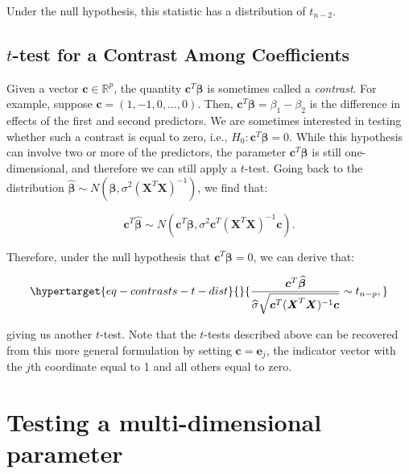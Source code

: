 \documentclass[
  11pt,
  letterpaper,
  oneside]{book}
\theoremstyle{definition}
\theoremstyle{plain}
\theoremstyle{plain}
\theoremstyle{plain}
\theoremstyle{remark}
\begin{document}
Under the null hypothesis, this statistic has a distribution of
\(t_{n-2}\).

\hypertarget{t-test-for-a-contrast-among-coefficients}{%
\subsection{\texorpdfstring{\(t\)-test for a Contrast Among
Coefficients}{t-test for a Contrast Among Coefficients}}\label{t-test-for-a-contrast-among-coefficients}}

Given a vector \(\boldsymbol{c} \in \mathbb{R}^p\), the quantity
\(\boldsymbol{c}^T \boldsymbol{\beta}\) is sometimes called a
\emph{contrast}. For example, suppose
\(\boldsymbol{c} = (1,-1, 0, \dots, 0)\). Then,
\(\boldsymbol{c}^T \boldsymbol{\beta} = \beta_1 - \beta_2\) is the
difference in effects of the first and second predictors. We are
sometimes interested in testing whether such a contrast is equal to
zero, i.e., \(H_0: \boldsymbol{c}^T \boldsymbol{\beta} = 0\). While this
hypothesis can involve two or more of the predictors, the parameter
\(\boldsymbol{c}^T \boldsymbol{\beta}\) is still one-dimensional, and
therefore we can still apply a \(t\)-test. Going back to the
distribution
\(\boldsymbol{\widehat{\beta}} \sim N(\boldsymbol{\beta}, \sigma^2(\boldsymbol{X}^T \boldsymbol{X})^{-1})\),
we find that:

\[
\boldsymbol{c}^T\boldsymbol{\widehat{\beta}} \sim N(\boldsymbol{c}^T\boldsymbol{\beta}, \sigma^2\boldsymbol{c}^T (\boldsymbol{X}^T \boldsymbol{X})^{-1} \boldsymbol{c}).
\]

Therefore, under the null hypothesis that
\(\boldsymbol{c}^T \boldsymbol{\beta} = 0\), we can derive that:

\begin{equation}\protect\hypertarget{eq-contrasts-t-dist}{}{
\frac{\boldsymbol{c}^T \boldsymbol{\widehat{\beta}}}{\widehat{\sigma} \sqrt{\boldsymbol{c}^T (\boldsymbol{X}^T \boldsymbol{X})^{-1} \boldsymbol{c}}} \sim t_{n-p},
}\label{eq-contrasts-t-dist}\end{equation}

giving us another \(t\)-test. Note that the \(t\)-tests described above
can be recovered from this more general formulation by setting
\(\boldsymbol{c} = \boldsymbol{e}_j\), the indicator vector with the
\(j\)th coordinate equal to 1 and all others equal to zero.

\hypertarget{sec-multi-dim-testing}{%
\section{Testing a multi-dimensional
parameter}\label{sec-multi-dim-testing}}
\end{document}
